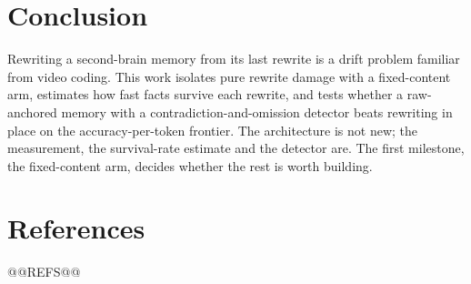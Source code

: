 \section{Conclusion}
Rewriting a second-brain memory from its last rewrite is a drift problem familiar from video coding. This work isolates pure rewrite damage with a fixed-content arm, estimates how fast facts survive each rewrite, and tests whether a raw-anchored memory with a contradiction-and-omission detector beats rewriting in place on the accuracy-per-token frontier. The architecture is not new; the measurement, the survival-rate estimate and the detector are. The first milestone, the fixed-content arm, decides whether the rest is worth building.

\section*{References}
\footnotesize
@@REFS@@


